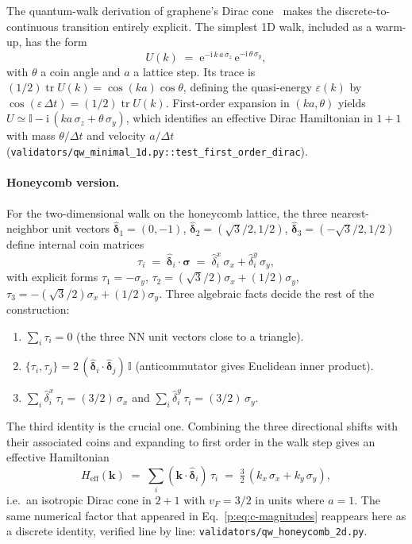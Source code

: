 \documentclass[a4paper,onecolumn,11pt]{quantumarticle}
\newcommand{\ii}{\ensuremath{\mathrm{i}}}
\newcommand{\bbI}{\ensuremath{\mathbb{I}}}
\def\vk{\ensuremath{\bm{k}}}
\def\vsigma{\ensuremath{\bm{\sigma}}}
\def\vdelta{\ensuremath{\bm{\delta}}}
\newcommand{\Hop}{\ensuremath{H}}
\newcommand{\Uop}{\ensuremath{U}}
\begin{document}
The quantum-walk derivation of graphene's Dirac cone~\cite{Arrighi2018} makes the
discrete-to-continuous transition entirely explicit. The simplest 1D
walk, included as a warm-up, has the form
\begin{equation}
\Uop(k) \;=\; \mathrm{e}^{-\ii\,k\,a\,\sigma_{z}}\,\mathrm{e}^{-\ii\,\theta\,\sigma_{y}} ,
\label{p:eq:U1Dminimal}
\end{equation}
with $\theta$ a coin angle and $a$ a lattice step. Its trace is
$(1/2)\operatorname{tr}\Uop(k) = \cos(ka)\cos\theta$, defining the
quasi-energy $\varepsilon(k)$ by $\cos(\varepsilon\,\Delta t) = (1/2)\operatorname{tr}\Uop(k)$.
First-order expansion in $(ka,\theta)$ yields
$\Uop \simeq \bbI - \ii\,(k a\,\sigma_{z} + \theta\,\sigma_{y})$,
which identifies an effective Dirac Hamiltonian in $1{+}1$ with mass
$\theta/\Delta t$ and velocity $a/\Delta t$
(\texttt{validators/qw\_minimal\_1d.py::test\_first\_order\_dirac}).

\paragraph{Honeycomb version.}
For the two-dimensional walk on the honeycomb lattice, the three
nearest-neighbor unit vectors $\hat{\vdelta}_{1}=(0,-1)$,
$\hat{\vdelta}_{2}=(\sqrt{3}/2,1/2)$,
$\hat{\vdelta}_{3}=(-\sqrt{3}/2,1/2)$ define internal coin matrices
\begin{equation}
\tau_{i} \;=\; \hat{\vdelta}_{i}\cdot\vsigma \;=\;
\hat{\delta}_{i}^{x}\,\sigma_{x} + \hat{\delta}_{i}^{y}\,\sigma_{y} ,
\end{equation}
with explicit forms
$\tau_{1} = -\sigma_{y}$,
$\tau_{2} = (\sqrt{3}/2)\sigma_{x}+(1/2)\sigma_{y}$,
$\tau_{3} = -(\sqrt{3}/2)\sigma_{x}+(1/2)\sigma_{y}$. Three algebraic
facts decide the rest of the construction:

\begin{enumerate}[leftmargin=*]
\item $\sum_{i}\tau_{i} = 0$ (the three NN unit vectors close to a
triangle).
\item $\{\tau_{i},\tau_{j}\}=2\,(\hat{\vdelta}_{i}\cdot\hat{\vdelta}_{j})\,\bbI$
(anticommutator gives Euclidean inner product).
\item $\sum_{i}\hat{\delta}_{i}^{x}\,\tau_{i} = (3/2)\,\sigma_{x}$ and
$\sum_{i}\hat{\delta}_{i}^{y}\,\tau_{i} = (3/2)\,\sigma_{y}$.
\end{enumerate}

The third identity is the crucial one. Combining the three directional
shifts with their associated coins and expanding to first order in the
walk step gives an effective Hamiltonian
\begin{equation}
\Hop_{\mathrm{eff}}(\vk) \;=\; \sum_{i}(\vk\cdot\hat{\vdelta}_{i})\,\tau_{i}
\;=\; \tfrac{3}{2}\,(k_x\,\sigma_x + k_y\,\sigma_y),
\label{p:eq:Heff-honeycomb}
\end{equation}
i.e.\ an isotropic Dirac cone in $2{+}1$ with $v_{F}=3/2$ in units where
$a=1$. The same numerical factor that appeared in
Eq.~\eqref{p:eq:c-magnitudes} reappears here as a discrete identity,
verified line by line:
\texttt{validators/qw\_honeycomb\_2d.py}.
\end{document}
